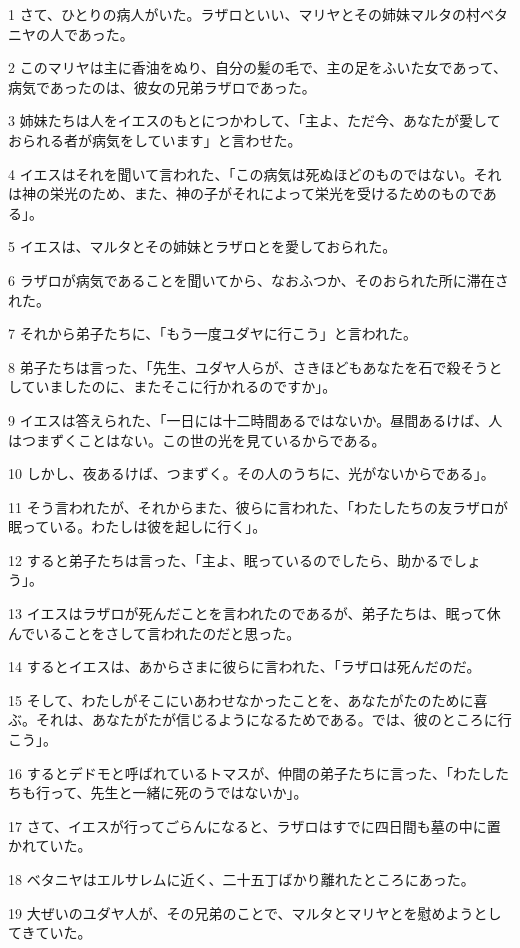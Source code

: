 \par 1 さて、ひとりの病人がいた。ラザロといい、マリヤとその姉妹マルタの村ベタニヤの人であった。
\par 2 このマリヤは主に香油をぬり、自分の髪の毛で、主の足をふいた女であって、病気であったのは、彼女の兄弟ラザロであった。
\par 3 姉妹たちは人をイエスのもとにつかわして、「主よ、ただ今、あなたが愛しておられる者が病気をしています」と言わせた。
\par 4 イエスはそれを聞いて言われた、「この病気は死ぬほどのものではない。それは神の栄光のため、また、神の子がそれによって栄光を受けるためのものである」。
\par 5 イエスは、マルタとその姉妹とラザロとを愛しておられた。
\par 6 ラザロが病気であることを聞いてから、なおふつか、そのおられた所に滞在された。
\par 7 それから弟子たちに、「もう一度ユダヤに行こう」と言われた。
\par 8 弟子たちは言った、「先生、ユダヤ人らが、さきほどもあなたを石で殺そうとしていましたのに、またそこに行かれるのですか」。
\par 9 イエスは答えられた、「一日には十二時間あるではないか。昼間あるけば、人はつまずくことはない。この世の光を見ているからである。
\par 10 しかし、夜あるけば、つまずく。その人のうちに、光がないからである」。
\par 11 そう言われたが、それからまた、彼らに言われた、「わたしたちの友ラザロが眠っている。わたしは彼を起しに行く」。
\par 12 すると弟子たちは言った、「主よ、眠っているのでしたら、助かるでしょう」。
\par 13 イエスはラザロが死んだことを言われたのであるが、弟子たちは、眠って休んでいることをさして言われたのだと思った。
\par 14 するとイエスは、あからさまに彼らに言われた、「ラザロは死んだのだ。
\par 15 そして、わたしがそこにいあわせなかったことを、あなたがたのために喜ぶ。それは、あなたがたが信じるようになるためである。では、彼のところに行こう」。
\par 16 するとデドモと呼ばれているトマスが、仲間の弟子たちに言った、「わたしたちも行って、先生と一緒に死のうではないか」。
\par 17 さて、イエスが行ってごらんになると、ラザロはすでに四日間も墓の中に置かれていた。
\par 18 ベタニヤはエルサレムに近く、二十五丁ばかり離れたところにあった。
\par 19 大ぜいのユダヤ人が、その兄弟のことで、マルタとマリヤとを慰めようとしてきていた。
